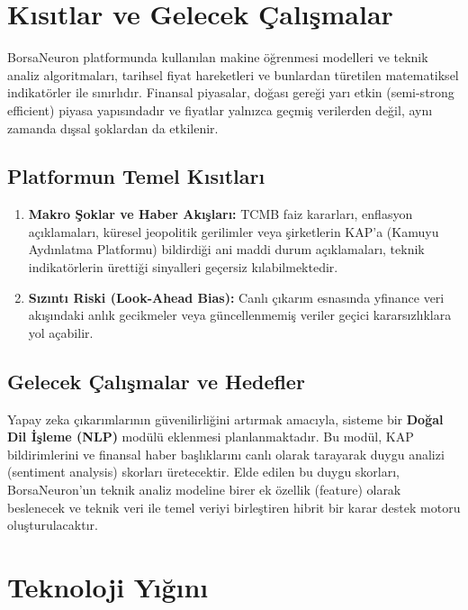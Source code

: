 \documentclass[12pt,a4paper]{report}
\begin{document}
\chapter{Kısıtlar ve Gelecek Çalışmalar}

BorsaNeuron platformunda kullanılan makine öğrenmesi modelleri ve teknik analiz algoritmaları, tarihsel fiyat hareketleri ve bunlardan türetilen matematiksel indikatörler ile sınırlıdır. Finansal piyasalar, doğası gereği yarı etkin (semi-strong efficient) piyasa yapısındadır ve fiyatlar yalnızca geçmiş verilerden değil, aynı zamanda dışsal şoklardan da etkilenir.

\section{Platformun Temel Kısıtları}
\begin{enumerate}
    \item \textbf{Makro Şoklar ve Haber Akışları:} TCMB faiz kararları, enflasyon açıklamaları, küresel jeopolitik gerilimler veya şirketlerin KAP'a (Kamuyu Aydınlatma Platformu) bildirdiği ani maddi durum açıklamaları, teknik indikatörlerin ürettiği sinyalleri geçersiz kılabilmektedir.
    \item \textbf{Sızıntı Riski (Look-Ahead Bias):} Canlı çıkarım esnasında yfinance veri akışındaki anlık gecikmeler veya güncellenmemiş veriler geçici kararsızlıklara yol açabilir.
\end{enumerate}

\section{Gelecek Çalışmalar ve Hedefler}
Yapay zeka çıkarımlarının güvenilirliğini artırmak amacıyla, sisteme bir \textbf{Doğal Dil İşleme (NLP)} modülü eklenmesi planlanmaktadır. Bu modül, KAP bildirimlerini ve finansal haber başlıklarını canlı olarak tarayarak duygu analizi (sentiment analysis) skorları üretecektir. Elde edilen bu duygu skorları, BorsaNeuron'un teknik analiz modeline birer ek özellik (feature) olarak beslenecek ve teknik veri ile temel veriyi birleştiren hibrit bir karar destek motoru oluşturulacaktır.

\chapter{Teknoloji Yığını}
\end{document}
